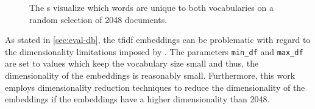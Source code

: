 \begin{figure}[!htb]%
    \centering
    \qquad
    \caption[\wordcloud{}s for different \acs*{tfidf} preprocessors]{The \wordcloud{}s visualize which words are unique to both vocabularies 
    on a random selection of 2048 documents.}%
    \label{fig:differences-vocabularies}%
\end{figure}

As stated in \autoref{sec:eval-db}, the \ac{tfidf} embeddings can be problematic 
with regard to the dimensionality limitations imposed by \databaseName{}.
The parameters \texttt{min\_df} and \texttt{max\_df} are set to values 
which keep the vocabulary size small and thus,
the dimensionality of the embeddings is reasonably small.
Furthermore, this work employs dimensionality reduction techniques to reduce the dimensionality of the embeddings 
if the embeddings have a higher dimensionality than 2048.
